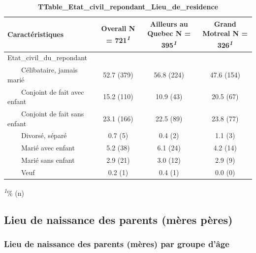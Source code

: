 \documentclass[
]{article}
\begin{document}
\newpage
\begin{table}[!t]
\caption{\label{tab:unnamed-chunk-28}\textbf{TTable\_Etat\_civil\_repondant\_Lieu\_de\_residence}} 
\fontsize{12.0pt}{14.4pt}\selectfont
\begin{tabular*}{\linewidth}{@{\extracolsep{\fill}}lccc}
\toprule
\textbf{Caractéristiques} & \textbf{Overall}  N = 721\textsuperscript{\textit{1}} & \textbf{Ailleurs au Quebec}  N = 395\textsuperscript{\textit{1}} & \textbf{Grand Motreal}  N = 326\textsuperscript{\textit{1}} \\ 
\midrule\addlinespace[2.5pt]
Etat\_civil\_du\_repondant &  &  &  \\ 
    Célibataire, jamais marié & 52.7 (379) & 56.8 (224) & 47.6 (154) \\ 
    Conjoint de fait avec enfant & 15.2 (110) & 10.9 (43) & 20.5 (67) \\ 
    Conjoint de fait sans enfant & 23.1 (166) & 22.5 (89) & 23.8 (77) \\ 
    Divorsé, séparé & 0.7 (5) & 0.4 (2) & 1.1 (3) \\ 
    Marié avec enfant & 5.2 (38) & 6.1 (24) & 4.2 (14) \\ 
    Marié sans enfant & 2.9 (21) & 3.0 (12) & 2.9 (9) \\ 
    Veuf & 0.2 (1) & 0.4 (1) & 0.0 (0) \\ 
\bottomrule
\end{tabular*}
\begin{minipage}{\linewidth}
\textsuperscript{\textit{1}}\% (n)\\
\end{minipage}
\end{table}
\vspace{1cm}

\hypertarget{lieu-de-naissance-des-parents-muxe8res-puxe8res}{%
\subsection{Lieu de naissance des parents (mères
pères)}\label{lieu-de-naissance-des-parents-muxe8res-puxe8res}}

\vspace{1cm}

\hypertarget{lieu-de-naissance-des-parents-muxe8res-par-groupe-duxe2ge}{%
\subsubsection{Lieu de naissance des parents (mères) par groupe
d'âge}\label{lieu-de-naissance-des-parents-muxe8res-par-groupe-duxe2ge}}
\end{document}
